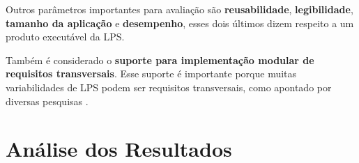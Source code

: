 Outros parâmetros importantes para avaliação são \textbf{reusabilidade}, \textbf{legibilidade}, 
\textbf{tamanho da aplicação} e \textbf{desempenho}, esses dois últimos dizem
respeito a um produto executável da LPS. 

Também é considerado o \textbf{suporte para implementação modular de requisitos transversais}.
Esse suporte é importante porque muitas variabilidades de LPS podem ser requisitos transversais,
como apontado por diversas pesquisas \cite{Gacek2001} \cite{Batory2004} \cite{Liu2006}
\cite{Lopez2005} \cite{mezini2004}.

\section{Análise dos Resultados}


